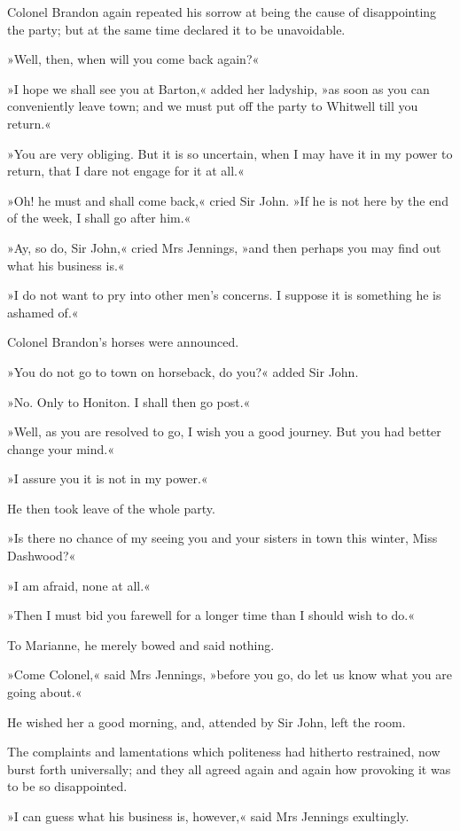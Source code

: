 Colonel Brandon again repeated his sorrow at being the cause of disappointing the party; but at the same time declared it to be unavoidable.

»Well, then, when will you come back again?«

»I hope we shall see you at Barton,« added her ladyship, »as soon as you can conveniently leave town; and we must put off the party to Whitwell till you return.«

»You are very obliging. But it is so uncertain, when I may have it in my power to return, that I dare not engage for it at all.«

»Oh! he must and shall come back,« cried Sir John. »If he is not here by the end of the week, I shall go after him.«

»Ay, so do, Sir John,« cried Mrs Jennings, »and then perhaps you may find out what his business is.«

»I do not want to pry into other men’s concerns. I suppose it is something he is ashamed of.«

Colonel Brandon’s horses were announced.

»You do not go to town on horseback, do you?« added Sir John.

»No. Only to Honiton. I shall then go post.«

»Well, as you are resolved to go, I wish you a good journey. But you had better change your mind.«

»I assure you it is not in my power.«

He then took leave of the whole party.

»Is there no chance of my seeing you and your sisters in town this winter, Miss Dashwood?«

»I am afraid, none at all.«

»Then I must bid you farewell for a longer time than I should wish to do.«

To Marianne, he merely bowed and said nothing.

»Come Colonel,« said Mrs Jennings, »before you go, do let us know what you are going about.«

He wished her a good morning, and, attended by Sir John, left the room.

The complaints and lamentations which politeness had hitherto restrained, now burst forth universally; and they all agreed again and again how provoking it was to be so disappointed.

»I can guess what his business is, however,« said Mrs Jennings exultingly.

